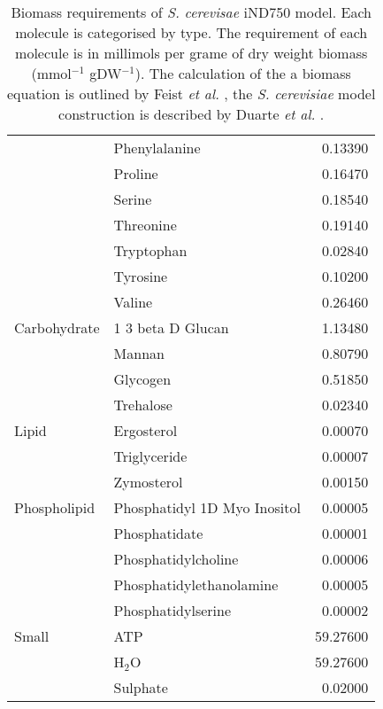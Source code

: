 \begin{table}
\begin{footnotesize}
\begin{tabular}{l l r}
                   & Phenylalanine                  &  0.13390    \\
                   & Proline                        &  0.16470    \\
                   & Serine                         &  0.18540    \\
                   & Threonine                      &  0.19140    \\
                   & Tryptophan                     &  0.02840    \\
                   & Tyrosine                       &  0.10200    \\
                   & Valine                         &  0.26460    \\ \midrule
      Carbohydrate & 1 3 beta D Glucan              &  1.13480    \\
                   & Mannan                         &  0.80790    \\
                   & Glycogen                       &  0.51850    \\
                   & Trehalose                      &  0.02340    \\ \midrule
      Lipid        & Ergosterol                     &  0.00070    \\
                   & Triglyceride                   &  0.00007    \\
                   & Zymosterol                     &  0.00150    \\
      Phospholipid & Phosphatidyl 1D Myo Inositol   &  0.00005    \\
                   & Phosphatidate                  &  0.00001    \\
                   & Phosphatidylcholine            &  0.00006    \\
                   & Phosphatidylethanolamine       &  0.00005    \\
                   & Phosphatidylserine             &  0.00002    \\ \midrule
      Small        & ATP                            & 59.27600    \\
                   & H$_2$O                         & 59.27600    \\
                   & Sulphate                       &  0.02000    \\ \bottomrule
  \end{tabular}
  \end{footnotesize}
  \caption[Biomass requirements of \emph{S. cerevisae} iND750 model]{Biomass requirements of \emph{S. cerevisae} iND750 model. Each molecule is categorised by type. The requirement of each molecule is in millimols per grame of dry weight biomass (mmol$^{-1}$ gDW$^{-1}$). The calculation of the a biomass equation is outlined by Feist \emph{et al.} \cite{feist2009}, the \emph{S. cerevisiae} model construction is described by Duarte \emph{et al.} \cite{duarte2004}.}
  \label{table:biomass_requirements}
\end{table}


